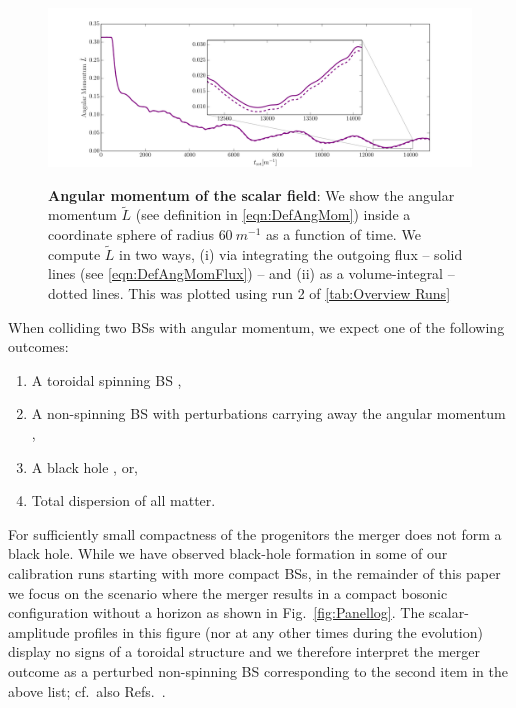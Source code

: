 \documentclass[aps,twocolumn,nofootinbib,superscriptaddress,amsfonts,floatfix
]{revtex4-1} %
\begin{document}
\begin{figure}[t]
\begin{center}
{\includegraphics[width=2.0\columnwidth]{ang_integrated_flux_with_radius_60}}
\caption{
    {\bf Angular momentum of the scalar field}: We show the angular
    momentum $\tilde{L}$ (see definition in  \cref{eqn:DefAngMom}) inside a coordinate sphere of radius $60~m^{-1}$ as a function of time. We compute
    $\tilde{L}$ in two ways, (i) via integrating the outgoing flux -- solid lines (see \cref{eqn:DefAngMomFlux}) -- and (ii) as a volume-integral --
    dotted lines. This was plotted using run 2 of \cref{tab:Overview
    Runs}}
\label{fig:AngMom}
\end{center}
\end{figure}
When colliding two BSs with angular momentum, we
expect one of the following outcomes:
\begin{enumerate}
    \item A toroidal spinning BS
        \cite{PhysRevD.90.024068,Yoshida:1997qf,1996rscc.conf..138S,Siemonsen:2020hcg},
    \item A non-spinning BS with perturbations carrying away the angular
        momentum
        \cite{Macedo:2013jja,Macedo:2016wgh,Yoshida:1994xi,Flores:2019iwp},
    \item A black hole \cite{Helfer:2018vtq,Palenzuela:2017kcg,Bezares:2018qwa}, or,
    \item Total dispersion of all matter.
\end{enumerate}
For sufficiently small compactness of the progenitors the merger does not form a black hole. While we have observed black-hole
formation in some of our calibration runs starting with more compact
BSs, in the remainder of this paper we focus on the scenario
where the merger results in a compact bosonic configuration
without a horizon as shown in Fig.~\ref{fig:Panellog}.
The scalar-amplitude profiles in this figure (nor at any other
times during the evolution) display no signs
of a toroidal structure and we therefore interpret the merger
outcome as a perturbed non-spinning BS corresponding to the
second item in the above list; cf.~also
Refs.~\cite{Palenzuela:2017kcg,Bezares:2018qwa}.
\end{document}
